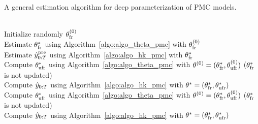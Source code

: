 \begin{algorithm}[htbp!]
  \caption{A general estimation algorithm for deep parameterization of PMC models.}
  \label{algo:algo_train_dpmc}
  \begin{algorithmic}[1]
  \\Initialize randomly $\theta_{\mathrm{fr}}^{(0)}$  \label{line:nondeep1} \\
  Estimate $\theta_{\mathrm{fr}}^*$ using Algorithm~\ref{algo:algo_theta_pmc} with $\theta_{\mathrm{fr}}^{(0)}$\\
  Estimate $\hat{y}_{0:T}^{\mathrm{pre}}$ using Algorithm~\ref{algo:algo_hk_pmc} with $\theta_{\mathrm{fr}}^*$ \label{line:nondeep3}
  \\ Compute $\theta_{\mathrm{ufr}}^{*}$
  using Algorithm~\ref{algo:algo_theta_pmc} with $\theta^{(0)}=(\theta_{\mathrm{fr}}^*, \theta_{\mathrm{ufr}}^{(0)})$  ($\theta_{\mathrm{fr}}^*$ is not updated)\\
  Compute $\hat{y}_{0:T}$ using Algorithm~\ref{algo:algo_hk_pmc} with $\theta^{*}=(\theta_{\mathrm{fr}}^*, \theta_{\mathrm{ufr}}^{*})$
  \\ Compute $\theta_{\mathrm{ufr}}^{*}$
    using Algorithm~\ref{algo:algo_theta_pmc} with $\theta^{(0)}=(\theta_{\mathrm{fr}}^*, \theta_{\mathrm{ufr}}^{(0)})$  ($\theta_{\mathrm{fr}}^*$ is not updated)\\
  Compute $\hat{y}_{0:T}$ using Algorithm~\ref{algo:algo_hk_pmc} with $\theta^{*}=(\theta_{\mathrm{fr}}^*, \theta_{\mathrm{ufr}}^{*})$
  \end{algorithmic}
\end{algorithm}


